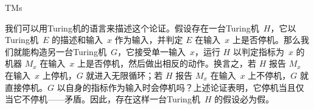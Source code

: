 \documentclass[../../../include/open-logic-section]{subfiles}
\begin{document}
\begin{tagblock}{TMs}
\begin{explain}
我们可以用Turing机的语言来描述这个论证。假设存在一台Turing机~$H$，它以Turing机~$E$ 的描述和输入~$x$ 作为输入，并判定 $E$ 在输入~$x$ 上是否停机。那么我们就能构造另一台Turing机~$G$，它接受单一输入~$x$，运行 $H$ 以判定指标为~$x$ 的机器 $M_x$ 在输入~$x$ 上是否停机，然后做出相反的动作。换言之，若 $H$ 报告 $M_x$ 在输入~$x$ 上停机，$G$ 就进入无限循环；若 $H$ 报告 $M_x$ 在输入~$x$ 上不停机，$G$ 就直接停机。$G$ 以自身的指标作为输入时会停机吗？上述论证表明，它停机当且仅当它不停机——矛盾。因此，存在这样一台Turing机~$H$ 的假设必为假。
\end{explain}
\end{tagblock}
\end{document}
